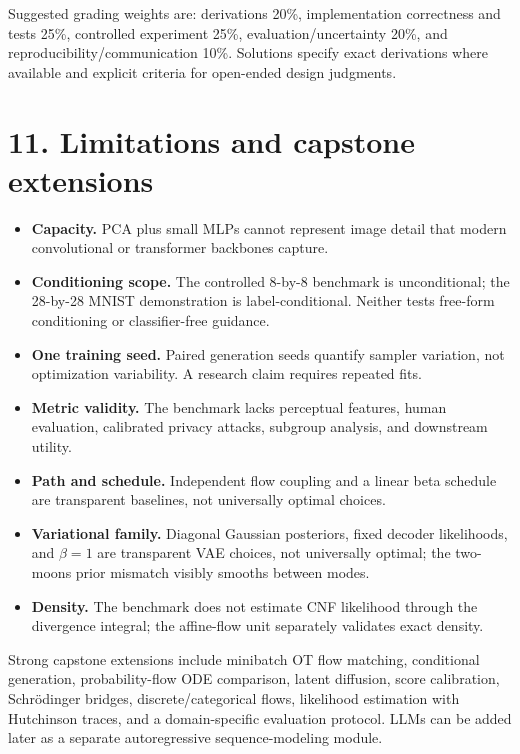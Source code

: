 \documentclass[11pt]{article}
\begin{document}
Suggested grading weights are: derivations 20\%, implementation correctness and
tests 25\%, controlled experiment 25\%, evaluation/uncertainty 20\%, and
reproducibility/communication 10\%. Solutions specify exact derivations where
available and explicit criteria for open-ended design judgments.

\section*{11. Limitations and capstone extensions}

\begin{itemize}
\item \textbf{Capacity.} PCA plus small MLPs cannot represent image detail that
modern convolutional or transformer backbones capture.
\item \textbf{Conditioning scope.} The controlled 8-by-8 benchmark is
unconditional; the 28-by-28 MNIST demonstration is label-conditional. Neither
tests free-form conditioning or classifier-free guidance.
\item \textbf{One training seed.} Paired generation seeds quantify sampler
variation, not optimization variability. A research claim requires repeated fits.
\item \textbf{Metric validity.} The benchmark lacks perceptual features, human
evaluation, calibrated privacy attacks, subgroup analysis, and downstream utility.
\item \textbf{Path and schedule.} Independent flow coupling and a linear beta
schedule are transparent baselines, not universally optimal choices.
\item \textbf{Variational family.} Diagonal Gaussian posteriors, fixed decoder
likelihoods, and $\beta=1$ are transparent VAE choices, not universally optimal;
the two-moons prior mismatch visibly smooths between modes.
\item \textbf{Density.} The benchmark does not estimate CNF likelihood through
the divergence integral; the affine-flow unit separately validates exact density.
\end{itemize}

Strong capstone extensions include minibatch OT flow matching, conditional
generation, probability-flow ODE comparison, latent diffusion, score calibration,
Schr\"odinger bridges, discrete/categorical flows, likelihood estimation with
Hutchinson traces, and a domain-specific evaluation protocol. LLMs can be added
later as a separate autoregressive sequence-modeling module.
\end{document}
